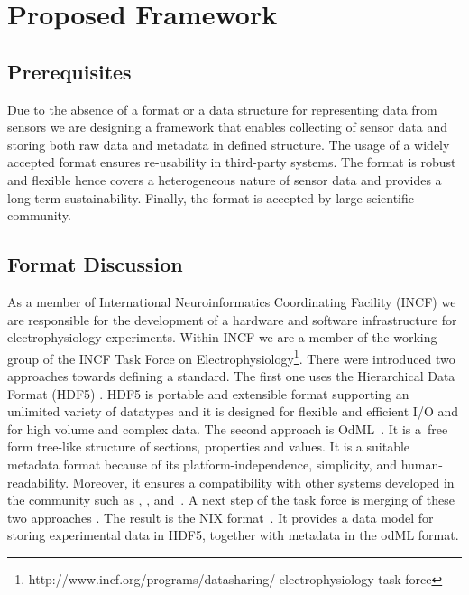 \documentclass[conference]{IEEEtran}
\begin{document}
\section{Proposed Framework}\label{sec:framework}

\subsection{Prerequisites}\label{sec:requirements}

Due to the absence of a format or a data structure for representing data from sensors we are designing a framework that enables collecting of sensor data and storing both raw data and metadata in defined structure. The usage of a widely accepted format ensures re-usability in third-party systems. The format is robust and flexible hence covers a heterogeneous nature of sensor data and provides a long term sustainability. Finally, the format is accepted by large scientific community. 

\subsection{Format Discussion}

As a member of International Neuroinformatics Coordinating Facility (INCF) \cite{wvangeit:Bjaalie:JNeurosci:2007} we are responsible for the development of a hardware and software infrastructure for electrophysiology experiments. Within INCF we are a member of the working group of the INCF Task Force on Electrophysiology\footnote{http://www.incf.org/programs/datasharing/ electrophysiology-task-force}. There were introduced two approaches towards defining a standard. The first one uses the Hierarchical Data Format (HDF5) \cite{hdf5}. HDF5 is portable and extensible format supporting an unlimited variety of datatypes and it is designed for flexible and efficient I/O and for high volume and complex data. The second approach is OdML~\cite{10.3389/fninf.2011.00016}. It is a~free form tree-like structure of sections, properties and values. It is a suitable metadata format because of its platform-independence, simplicity, and human-readability. Moreover, it ensures a compatibility with other systems developed in the community such as \cite{10.3389/conf.fninf.2014.18.00029}, \cite{10.3389/conf.fninf.2014.18.00053}, and~\cite{10.3389/conf.fninf.2013.09.00025}. A next step of the task force is merging of these two approaches \cite{10.3389/conf.fninf.2013.09.00069}. The result is the NIX format~\cite{Stoewer:2014}. It provides a data model for storing experimental data in HDF5, together with metadata in the odML format.
\end{document}
